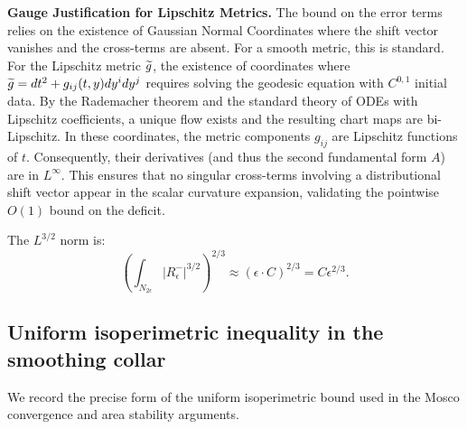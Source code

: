 \begin{theorem}
\textbf{Gauge Justification for Lipschitz Metrics.}
The bound on the error terms relies on the existence of Gaussian Normal Coordinates where the shift vector vanishes and the cross-terms are absent. For a smooth metric, this is standard. For the Lipschitz metric $\widetilde{g}$, the existence of coordinates where $\widetilde{g} = dt^2 + g_{ij}(t,y)dy^i dy^j$ requires solving the geodesic equation with $C^{0,1}$ initial data. By the Rademacher theorem and the standard theory of ODEs with Lipschitz coefficients, a unique flow exists and the resulting chart maps are bi-Lipschitz. In these coordinates, the metric components $g_{ij}$ are Lipschitz functions of $t$. Consequently, their derivatives (and thus the second fundamental form $A$) are in $L^\infty$. This ensures that no singular cross-terms involving a distributional shift vector appear in the scalar curvature expansion, validating the pointwise $O(1)$ bound on the deficit.

The $L^{3/2}$ norm is:
\[ \left( \int_{N_{2\epsilon}} |R^-_\epsilon|^{3/2} \right)^{2/3} \approx (\epsilon \cdot C)^{2/3} = C \epsilon^{2/3}. \]
\end{theorem}

\subsection{Uniform isoperimetric inequality in the smoothing collar}
We record the precise form of the uniform isoperimetric bound used in the Mosco convergence and area stability arguments.

